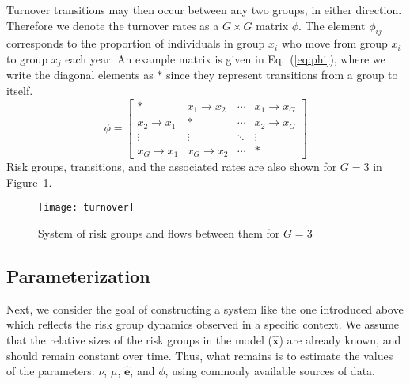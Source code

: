 \par
Turnover transitions may then occur between any two groups, in either direction.
Therefore we denote the turnover rates as a $G \times G$ matrix $\phi$.
The element $\phi_{ij}$ corresponds to the proportion of individuals in group $x_i$
who move from group $x_i$ to group $x_j$ each year.
An example matrix is given in Eq.~(\ref{eq:phi}),
where we write the diagonal elements as $*$ since they represent
transitions from a group to itself.
\begin{equation}\label{eq:phi}
\phi = \left[\begin{array}{cccc}
	         *          & x_1  \rightarrow x_2 & \cdots & x_1 \rightarrow x_G \\[0.5em]
	x_2 \rightarrow x_1 &          *           & \cdots & x_2 \rightarrow x_G \\[0.5em]
	      \vdots        &        \vdots        & \ddots &       \vdots        \\[0.5em]
	x_G \rightarrow x_1 & x_G \rightarrow x_2  & \cdots &          *
\end{array}\right]
\end{equation}
Risk groups, transitions, and the associated rates
are also shown for $G = 3$ in Figure~\ref{fig:system}.
\begin{figure}
  \centering
  \texttt{[image: turnover]}
  \caption{System of risk groups and flows between them for $G = 3$}
  \label{fig:system}
\end{figure}
\subsection{Parameterization}
\label{ss:params}
Next, we consider the goal of constructing a system like the one introduced above
which reflects the risk group dynamics observed in a specific context.
We assume that the relative sizes of the risk groups in the model ($\bm{\hat{x}}$)
are already known, and should remain constant over time.
Thus, what remains is to estimate the values of the parameters:
$\nu$, $\mu$, $\bm{\hat{e}}$, and $\phi$,
using commonly available sources of data.
